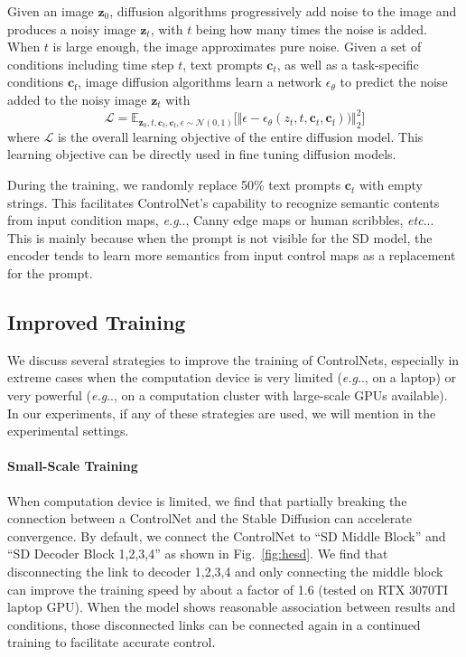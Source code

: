 \documentclass{article}
\makeatletter
\DeclareRobustCommand\onedot{\futurelet\@let@token\@onedot}
\def\@onedot{\ifx\@let@token.\else.\null\fi\xspace}
\def\eg{\emph{e.g}\onedot}
\def\etc{\emph{etc}\onedot}
\makeatother
\begin{document}
Given an image $\bm{z}_0$, diffusion algorithms progressively add noise to the image and produces a noisy image $\bm{z}_t$, with $t$ being how many times the noise is added. When $t$ is large enough, the image approximates pure noise. Given a set of conditions including time step $t$, text prompts $\bm{c}_t$, as well as a task-specific conditions $\bm{c}_\text{f}$, image diffusion algorithms learn a network $\epsilon_\theta$ to predict the noise added to the noisy image $\bm{z}_t$ with
\begin{equation}
	\mathcal{L} = \mathbb{E}_{\bm{z}_0, t, \bm{c}_t, \bm{c}_\text{f}, \epsilon \sim \mathcal{N}(0, 1) }\Big[ \Vert \epsilon - \epsilon_\theta(z_{t}, t, \bm{c}_t, \bm{c}_\text{f})) \Vert_{2}^{2}\Big]
	\label{eq:loss}
\end{equation}
where $\mathcal{L}$ is the overall learning objective of the entire diffusion model. This learning objective can be directly used in fine tuning diffusion models.

During the training, we randomly replace 50\% text prompts $\bm{c}_t$ with empty strings. This facilitates ControlNet's capability to recognize semantic contents from input condition maps, \eg, Canny edge maps or human scribbles, \etc. This is mainly because when the prompt is not visible for the SD model, the encoder tends to learn more semantics from input control maps as a replacement for the prompt.

\subsection{Improved Training}
\label{train2}

We discuss several strategies to improve the training of ControlNets, especially in extreme cases when the computation device is very limited (\eg, on a laptop) or very powerful (\eg, on a computation cluster with large-scale GPUs available). In our experiments, if any of these strategies are used, we will mention in the experimental settings.

\paragraph{Small-Scale Training}

When computation device is limited, we find that partially breaking the connection between a ControlNet and the Stable Diffusion can accelerate convergence. By default, we connect the ControlNet to ``SD Middle Block'' and ``SD Decoder Block 1,2,3,4'' as shown in Fig.~\ref{fig:hesd}. We find that disconnecting the link to decoder 1,2,3,4 and only connecting the middle block can improve the training speed by about a factor of 1.6 (tested on RTX 3070TI laptop GPU). When the model shows reasonable association between results and conditions, those disconnected links can be connected again in a continued training to facilitate accurate control.
\end{document}
